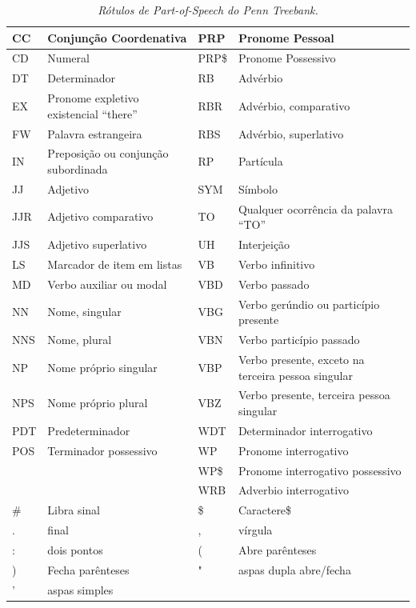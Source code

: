\begin{table}
   \centering
   \small
   \caption{\it Rótulos de Part-of-Speech do Penn Treebank.}

   \begin{tabular}{| p{2cm} | p{4cm} | p{2cm} | p{4cm} |}

   \hline

		CC & Conjunção Coordenativa 	& 	PRP & Pronome Pessoal\\
    \hline
		CD & Numeral &   	PRP\$ & Pronome Possessivo\\
      \hline
		DT & Determinador     &		RB & Advérbio\\
      \hline
		EX & Pronome expletivo existencial ``there''     &		RBR & Advérbio, comparativo\\
      \hline
		FW & Palavra estrangeira     &		RBS & Advérbio, superlativo\\
      \hline
		IN & Preposição ou conjunção subordinada      &		RP & Partícula\\
      \hline
		JJ & Adjetivo      &		SYM & Símbolo\\
      \hline
		JJR & Adjetivo comparativo      &		TO & Qualquer ocorrência da palavra ``TO''\\
      \hline
		JJS & Adjetivo superlativo      &		UH & Interjeição\\
      \hline
		LS & Marcador de item em listas      &		VB & Verbo infinitivo\\
      \hline
		MD & Verbo auxiliar ou modal      &		VBD & Verbo passado\\
      \hline
		NN & Nome, singular      &		VBG & Verbo gerúndio ou particípio presente\\
      \hline
		NNS & Nome, plural      &		VBN & Verbo particípio passado\\
      \hline
		NP & Nome próprio singular      &		VBP & Verbo presente, exceto na terceira pessoa singular\\
      \hline
		NPS & Nome próprio plural      &		VBZ & Verbo presente, terceira pessoa singular\\
      \hline
		PDT & Predeterminador      &		WDT & Determinador interrogativo\\
      \hline
		POS & Terminador possessivo      &		WP & Pronome interrogativo\\
    \hline
     & & 	WP\$ & Pronome interrogativo possessivo\\
    \hline
     & & 	WRB & Adverbio interrogativo  \\
    \hline
     \# & Libra sinal & \$ & Caractere\$ \\
    \hline
     . & final & , & vírgula \\
    \hline
     : & dois pontos & ( & Abre parênteses \\
    \hline
     ) & Fecha parênteses & " & aspas dupla abre/fecha \\
     \hline
     ' & aspas simples & &  \\
    \hline

   \end{tabular}
   \label{tbl:penn_treebank_pos}
\end{table}


